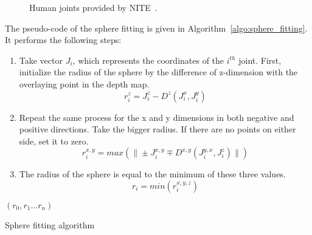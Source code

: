 \begin{figure}[h]
\centerline{}
\caption{Human joints provided by NITE~\cite{Microsoft2013}.}
\label{fig:nite_joints}
\end{figure}

The pseudo-code of the sphere fitting is given in Algorithm~\ref{algo:sphere_fitting}. It performs the following steps:
\begin{enumerate}
\item Take vector $J_i$, which represents the coordinates of the $i^{th}$
joint.
First, initialize the radius of the sphere by the difference of z-dimension with the overlaying point in the depth map.
\begin{equation}
r_i^z=J_i^z-D^z(J_i^x,J_i^y)
\label{eqn:z_sphere_radius}
\end{equation}
\item Repeat the same process for the x and y dimensions in both negative and positive directions. Take the bigger radius. If there are no points on either side, set it to zero.
\begin{equation}
r_i^{x,y}=max(\| \pm J_i^{x,y} \mp D^{x,y}(J_i^{y,x},J_i^z)\|)
\label{eqn:x_y_sphere_radius}
\end{equation}
\item The radius of the sphere is equal to the minimum of these three values.
\begin{equation}
r_i=min(r_i^{x,y,z})
\label{eqn:minimum_sphere-radius}
\end{equation}
\end{enumerate}

\begin{algorithm}[ht]
\DontPrintSemicolon %
\Return $(r_0,r_1 \ldots r_n)$ 
\caption{Sphere fitting algorithm}
\label{algo:sphere_fitting}
\end{algorithm}


